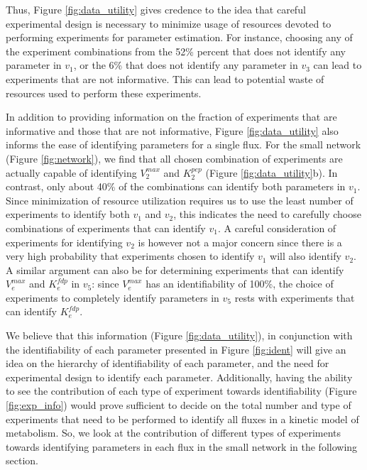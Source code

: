 \documentclass[10pt]{article}
\begin{document}
	Thus, Figure \ref{fig:data_utility} gives credence to the idea that careful experimental design is necessary to minimize usage of resources devoted to performing experiments for parameter estimation. For instance, choosing any of the experiment combinations from the 52\% percent that does not identify any parameter in $v_1$, or the 6\% that does not identify any parameter in $v_3$ can lead to experiments that are not informative. This can lead to potential waste of resources used to perform these experiments.	 
	
	In addition to providing information on the fraction of experiments that are informative and those that are not informative, Figure \ref{fig:data_utility} also informs the ease of identifying parameters for a single flux. For the small network (Figure \ref{fig:network}), we find that all chosen combination of experiments are actually capable of identifying $V_2^{max}$ and $K_2^{pep}$ (Figure \ref{fig:data_utility}b). In contrast, only about 40\% of the combinations can identify both parameters in $v_1$. Since minimization of resource utilization requires us to use the least number of experiments to identify both $v_1$ and $v_2$, this indicates the need to carefully choose combinations of experiments that can identify $v_1$. A careful consideration of experiments for identifying $v_2$ is however not a major concern since there is a very high probability that experiments chosen to identify $v_1$ will also identify $v_2$. A similar argument can also be for determining experiments that can identify $V_e^{max}$ and $K_e^{fdp}$ in $v_5$: since $V_e^{max}$ has an identifiability of 100\%, the choice of experiments to completely identify parameters in $v_5$ rests with experiments that can identify $K_e^{fdp}$.
	
	We believe that this information (Figure \ref{fig:data_utility}), in conjunction with the identifiability of each parameter presented in Figure \ref{fig:ident} will give an idea on the hierarchy of identifiability of each parameter, and the need for experimental design to identify each parameter. Additionally, having the ability to see the contribution of each type of experiment towards identifiability (Figure \ref{fig:exp_info}) would prove sufficient to decide on the total number and type of experiments that need to be performed to identify all fluxes in a kinetic model of metabolism. So, we look at the contribution of different types of experiments towards identifying parameters in each flux in the small network in the following section.
		
\end{document}
